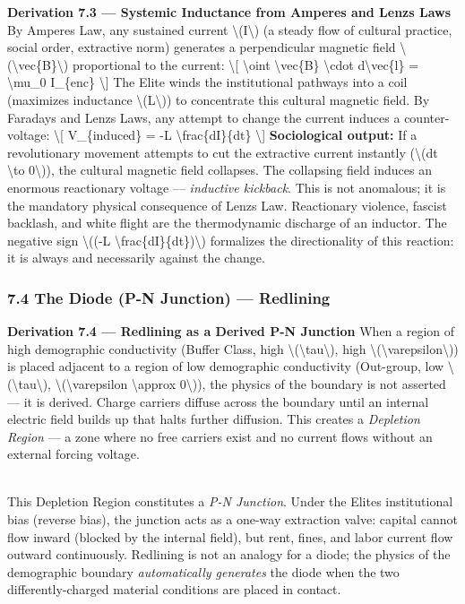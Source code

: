 {\textbf{Derivation 7.3 --- Systemic Inductance from
Ampere\textquotesingle s and Lenz\textquotesingle s Laws} By
Ampere\textquotesingle s Law, any sustained current
\textbackslash(I\textbackslash) (a steady flow of cultural practice,
social order, extractive norm) generates a perpendicular magnetic field
\textbackslash(\textbackslash vec\{B\}\textbackslash) proportional to
the current: \textbackslash{[} \textbackslash oint
\textbackslash vec\{B\} \textbackslash cdot d\textbackslash vec\{l\} =
\textbackslash mu\_0 I\_\{enc\} \textbackslash{]} The Elite winds the
institutional pathways into a coil (maximizes inductance
\textbackslash(L\textbackslash)) to concentrate this cultural magnetic
field. By Faraday\textquotesingle s and Lenz\textquotesingle s Laws, any
attempt to change the current induces a counter-voltage:
\textbackslash{[} V\_\{induced\} = -L \textbackslash frac\{dI\}\{dt\}
\textbackslash{]} \textbf{Sociological output:} If a revolutionary
movement attempts to cut the extractive current instantly
(\textbackslash(dt \textbackslash to 0\textbackslash)), the cultural
magnetic field collapses. The collapsing field induces an enormous
reactionary voltage --- \emph{inductive kickback}. This is not
anomalous; it is the mandatory physical consequence of
Lenz\textquotesingle s Law. Reactionary violence, fascist backlash, and
white flight are the thermodynamic discharge of an inductor. The
negative sign \textbackslash((-L
\textbackslash frac\{dI\}\{dt\})\textbackslash) formalizes the
directionality of this reaction: it is always and necessarily against
the change.

\subsubsection{7.4 The Diode (P-N Junction) ---
Redlining}\label{the-diode-p-n-junction-redlining}

\textbf{Derivation 7.4 --- Redlining as a Derived P-N Junction} When a
region of high demographic conductivity (Buffer Class, high
\textbackslash(\textbackslash tau\textbackslash), high
\textbackslash(\textbackslash varepsilon\textbackslash)) is placed
adjacent to a region of low demographic conductivity (Out-group, low
\textbackslash(\textbackslash tau\textbackslash),
\textbackslash(\textbackslash varepsilon \textbackslash approx
0\textbackslash)), the physics of the boundary is not asserted --- it is
derived. Charge carriers diffuse across the boundary until an internal
electric field builds up that halts further diffusion. This creates a
\emph{Depletion Region} --- a zone where no free carriers exist and no
current flows without an external forcing voltage.\\
\strut \\
This Depletion Region constitutes a \emph{P-N Junction}. Under the
Elite\textquotesingle s institutional bias (reverse bias), the junction
acts as a one-way extraction valve: capital cannot flow inward (blocked
by the internal field), but rent, fines, and labor current flow outward
continuously. Redlining is not an analogy for a diode; the physics of
the demographic boundary \emph{automatically generates} the diode when
the two differently-charged material conditions are placed in contact.

}
